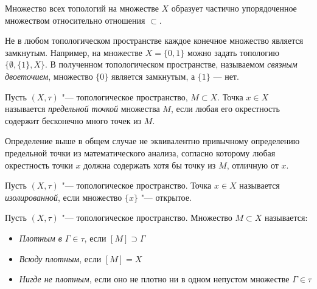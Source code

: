 \begin{note}
	Множество всех топологий на множестве $X$ образует частично упорядоченное множеством относительно отношения $\subset$.
\end{note}

\begin{note}
	Не в любом топологическом пространстве каждое конечное множество является замкнутым. Например, на множестве $X = \{ 0, 1\}$ можно задать топологию $\{\emptyset, \{1\}, X\}$. В полученном топологическом пространстве, называемом \emph{связным двоеточием}, множество $\{0\}$ является замкнутым, а $\{1\}$ --- нет.
\end{note}

\begin{definition}
	Пусть $(X, \tau)$ "--- топологическое пространство, $M \subset X$. Точка ${x \in X}$ называется \textit{предельной точкой} множества $M$, если любая его окрестность содержит бесконечно много точек из $M$.
\end{definition}

\begin{note}
	Определение выше в общем случае не эквивалентно привычному определению предельной точки из математического анализа, согласно которому любая окрестность точки $x$ должна содержать хотя бы точку из $M$, отличную от $x$.
\end{note}

\begin{definition}
	Пусть $(X, \tau)$ "--- топологическое пространство. Точка $x \in X$ называется \textit{изолированной}, если множество $\{x\}$ "--- открытое.
\end{definition}

\begin{definition}
	Пусть $(X, \tau)$ "--- топологическое пространство. Множество $M \subset X$ называется:
	\begin{itemize}
		\item \textit{Плотным в $\Gamma \in \tau$}, если $[M] \supset \Gamma$
		\item \textit{Всюду плотным}, если $[M] = X$
		\item \textit{Нигде не плотным}, если оно не плотно ни в одном непустом множестве $\Gamma \in \tau$
	\end{itemize}
\end{definition}

